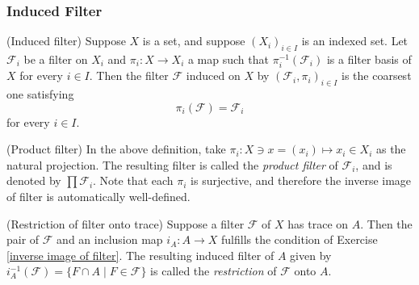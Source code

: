 \documentclass{article}
\begin{document}


\subsubsection{Induced Filter} \label{induced filter}

\begin{dfn} (Induced filter)
    Suppose \( X \) is a set, and suppose \( (X_i)_{i \in I} \) is an indexed set. Let \( \mathscr{F}_i \) be a filter on \( X_i \) and \( \pi_i:X \to X_i \) a map such that \( \pi_i ^{-1}(\mathscr{F}_i) \) is a filter basis of \( X \) for every \( i \in I \). Then the filter \( \mathscr{F} \) induced on \( X \) by \( (\mathscr{F}_i ,\pi_i)_{i \in I} \) is the coarsest one satisfying
    \begin{equation*}
        \pi_i(\mathscr{F}) = \mathscr{F}_i
    \end{equation*}
    for every \( i \in I \).
\end{dfn}

\begin{ex} (Product filter)
    In the above definition, take \( \pi_i :X \ni x = (x_i) \mapsto x_i \in X_i \) as the natural projection. The resulting filter is called the \textit{product filter} of \( \mathscr{F}_i \), and is denoted by \( \prod \mathscr{F}_i \). Note that each \( \pi_i \) is surjective, and therefore the inverse image of filter is automatically well-defined.
\end{ex}

\begin{ex} (Restriction of filter onto trace)
    Suppose a filter \( \mathscr{F} \) of \( X \) has trace on \( A \). Then the pair of \( \mathscr{F} \) and an inclusion map \( i_A:A \to X \) fulfills the condition of Exercise \ref{inverse image of filter}. The resulting induced filter of \( A \) given by \(i_A^{-1}(\mathscr{F}) =\{F \cap A \mid F \in \mathscr{F}\} \) is called the \textit{restriction} of \( \mathscr{F} \) onto \( A \).
\end{ex}
\end{document}
